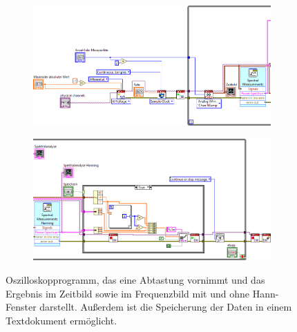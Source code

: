 \documentclass[
a4paper,
12pt,
pagesize,
ngerman
]{scrartcl}
\begin{document}
	\begin{figure}[H]
		\centering
		\begin{subfigure}[t]{1.0\textwidth}
			\centering
			\includegraphics[width=1.0\textwidth]{EIRE2018Dateien/Tag3/ManuellVIdTeil1}
		\end{subfigure}
	
		\vspace{0,2cm}
		
		\begin{subfigure}[t]{1.0\textwidth}
			\centering
			\includegraphics[width=1.0\textwidth]{EIRE2018Dateien/Tag3/ManuellVIdTeil2}
		\end{subfigure}
		\caption{Oszilloskopprogramm, das eine Abtastung vornimmt und das Ergebnis im Zeitbild sowie im Frequenzbild mit und ohne Hann-Fenster darstellt. Außerdem ist die Speicherung der Daten in einem Textdokument ermöglicht.}
		\label{fig_tag23_oszi_manuell_block}
	\end{figure}

\end{document}
